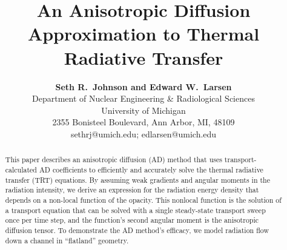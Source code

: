 \documentclass[11pt,letter,twoside]{mc2011}
\begin{document}
\title{An Anisotropic Diffusion Approximation to Thermal Radiative
Transfer}

\author{
\textbf{Seth R.~Johnson and Edward W.~Larsen}\\
Department of Nuclear Engineering \& Radiological Sciences\\
University of Michigan \\
2355 Bonisteel Boulevard, Ann Arbor, MI, 48109\\
sethrj@umich.edu; edlarsen@umich.edu
}

\maketitle

\thispagestyle{empty}

\begin{abstract}
This paper describes an anisotropic diffusion (AD) method that uses
transport-calculated AD coefficients to efficiently and accurately solve the
thermal radiative transfer (TRT) equations. By assuming weak gradients and angular moments in the radiation
intensity, we derive an expression for the radiation energy density that
depends on a non-local function of the opacity. This nonlocal function is the
solution of a transport equation that can be solved with a single steady-state
transport sweep once per time step, and the function's second angular moment is
the anisotropic diffusion tensor.
To demonstrate the AD method's efficacy, we model radiation flow down a channel 
in ``flatland'' geometry. 


\end{abstract}

\newcommand\authorname{Seth~R.~Johnson and Edward~W.~Larsen}
\newcommand\shorttitlename{Anisotropic diffusion for TRT}


\end{document}
